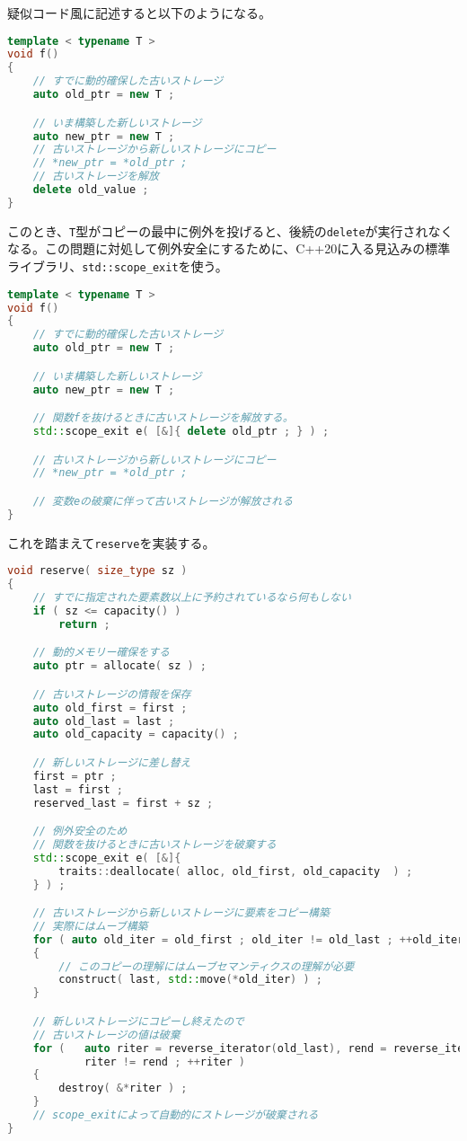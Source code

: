 疑似コード風に記述すると以下のようになる。

\ifTombow\pagebreak\fi
\begin{lstlisting}[language={C++}]
template < typename T >
void f()
{
    // すでに動的確保した古いストレージ
    auto old_ptr = new T ;

    // いま構築した新しいストレージ
    auto new_ptr = new T ;
    // 古いストレージから新しいストレージにコピー
    // *new_ptr = *old_ptr ;
    // 古いストレージを解放
    delete old_value ;
}
\end{lstlisting}

このとき、\texttt{T}型がコピーの最中に例外を投げると、後続の\texttt{delete}が実行されなくなる。この問題に対処して例外安全にするために、C++20に入る見込みの標準ライブラリ、\texttt{std::scope\_exit}を使う。

\begin{lstlisting}[language={C++}]
template < typename T >
void f()
{
    // すでに動的確保した古いストレージ
    auto old_ptr = new T ;

    // いま構築した新しいストレージ
    auto new_ptr = new T ;

    // 関数fを抜けるときに古いストレージを解放する。
    std::scope_exit e( [&]{ delete old_ptr ; } ) ;

    // 古いストレージから新しいストレージにコピー
    // *new_ptr = *old_ptr ;

    // 変数eの破棄に伴って古いストレージが解放される
}
\end{lstlisting}

これを踏まえて\texttt{reserve}を実装する。

\begin{lstlisting}[language={C++}]
void reserve( size_type sz )
{
    // すでに指定された要素数以上に予約されているなら何もしない
    if ( sz <= capacity() )
        return ;

    // 動的メモリー確保をする
    auto ptr = allocate( sz ) ;

    // 古いストレージの情報を保存
    auto old_first = first ;
    auto old_last = last ;
    auto old_capacity = capacity() ;

    // 新しいストレージに差し替え
    first = ptr ;
    last = first ;
    reserved_last = first + sz ;

    // 例外安全のため
    // 関数を抜けるときに古いストレージを破棄する
    std::scope_exit e( [&]{
        traits::deallocate( alloc, old_first, old_capacity  ) ;
    } ) ;

    // 古いストレージから新しいストレージに要素をコピー構築
    // 実際にはムーブ構築
    for ( auto old_iter = old_first ; old_iter != old_last ; ++old_iter, ++last )
    {
        // このコピーの理解にはムーブセマンティクスの理解が必要
        construct( last, std::move(*old_iter) ) ;
    }

    // 新しいストレージにコピーし終えたので
    // 古いストレージの値は破棄
    for (   auto riter = reverse_iterator(old_last), rend = reverse_iterator(old_first) ;
            riter != rend ; ++riter )
    {
        destroy( &*riter ) ;
    }
    // scope_exitによって自動的にストレージが破棄される
}
\end{lstlisting}

